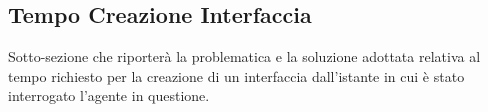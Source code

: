 \subsection{Tempo Creazione Interfaccia}

Sotto-sezione che riporterà la problematica e la soluzione adottata relativa al tempo richiesto per la creazione di un interfaccia dall'istante in cui è stato interrogato l'agente in questione.
